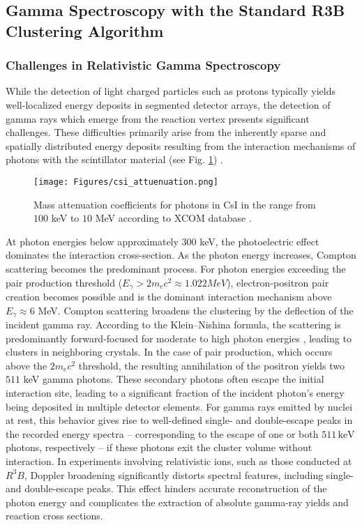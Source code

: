 \subsection{Gamma Spectroscopy with the Standard R3B Clustering Algorithm}
\subsubsection{Challenges in Relativistic Gamma Spectroscopy}
While the detection of light charged particles such as protons typically yields well-localized energy deposits in segmented detector arrays, the detection of gamma rays which emerge from the reaction vertex presents significant challenges. These difficulties primarily arise from the inherently sparse and spatially distributed energy deposits resulting from the interaction mechanisms of photons with the scintillator material (see Fig. \ref{fig:csi}) \cite{kolanoski2016teilchendetektoren}.\newline
\begin{figure}[!htb]
        \centering
        \texttt{[image: Figures/csi\_attuenuation.png]}
        \caption{Mass attenuation coefficients for photons in CsI in the range from $100$ keV to $10$ MeV according to XCOM database \cite{seltzer2010xcom}.}
        \label{fig:csi}%
\end{figure}
At photon energies below approximately $300$ keV, the photoelectric effect dominates the interaction cross-section. As the photon energy increases, Compton scattering becomes the predominant process. For photon energies exceeding the pair production threshold ($E_{\gamma} > 2m_{e}c^2 \approx 1.022 MeV$), electron-positron pair creation becomes possible and is the dominant interaction mechanism above $E_{\gamma} \approx 6$ MeV.\newline
Compton scattering broadens the clustering by the deflection of the incident gamma ray. According to the Klein–Nishina formula, the scattering is predominantly forward-focused for moderate to high photon energies \cite{klein1929streuung}, leading to clusters in neighboring crystals.\newline
In the case of pair production, which occurs above the $2m_ec^2$ threshold, the resulting annihilation of the positron yields two $511$ keV gamma photons. These secondary photons often escape the initial interaction site, leading to a significant fraction of the incident photon’s energy being deposited in multiple detector elements.\newline
For gamma rays emitted by nuclei at rest, this behavior gives rise to well-defined single- and double-escape peaks in the recorded energy spectra -- corresponding to the escape of one or both $511\,\mathrm{keV}$ photons, respectively -- if these photons exit the cluster volume without interaction.\newline
In experiments involving relativistic ions, such as those conducted at $R^3B$, Doppler broadening significantly distorts spectral features, including single- and double-escape peaks\cite{knoll2010radiation}. This effect hinders accurate reconstruction of the photon energy and complicates the extraction of absolute gamma-ray yields and reaction cross sections.

